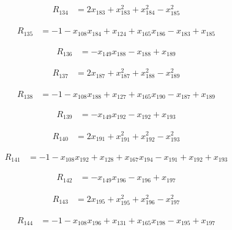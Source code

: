 \begin{align*}
R_{134} &= 2 x_{183} +x_{183}^{2} +x_{184}^{2} -x_{185}^{2}
\end{align*}

\begin{align*}
R_{135} &= -1 -x_{108} x_{184} +x_{124} +x_{165} x_{186} -x_{183} +x_{185}
\end{align*}

\begin{align*}
R_{136} &= -x_{149} x_{188} -x_{188} +x_{189}
\end{align*}

\begin{align*}
R_{137} &= 2 x_{187} +x_{187}^{2} +x_{188}^{2} -x_{189}^{2}
\end{align*}

\begin{align*}
R_{138} &= -1 -x_{108} x_{188} +x_{127} +x_{165} x_{190} -x_{187} +x_{189}
\end{align*}

\begin{align*}
R_{139} &= -x_{149} x_{192} -x_{192} +x_{193}
\end{align*}

\begin{align*}
R_{140} &= 2 x_{191} +x_{191}^{2} +x_{192}^{2} -x_{193}^{2}
\end{align*}

\begin{align*}
R_{141} &= -1 -x_{108} x_{192} +x_{128} +x_{167} x_{194} -x_{191} +x_{192} +x_{193}
\end{align*}

\begin{align*}
R_{142} &= -x_{149} x_{196} -x_{196} +x_{197}
\end{align*}

\begin{align*}
R_{143} &= 2 x_{195} +x_{195}^{2} +x_{196}^{2} -x_{197}^{2}
\end{align*}

\begin{align*}
R_{144} &= -1 -x_{108} x_{196} +x_{131} +x_{165} x_{198} -x_{195} +x_{197}
\end{align*}

